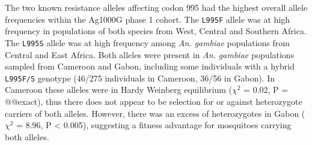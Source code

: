 \documentclass[a4paper,11pt,abstracton,hidelinks]{scrartcl}
\begin{document}
The two known resistance alleles affecting codon 995 had the highest overall allele frequencies within the Ag1000G phase 1 cohort.
%
The \texttt{L995F} allele was at high frequency in populations of both species from West, Central and Southern Africa.
%
The \texttt{L995S} allele was at high frequency among \textit{An. gambiae} populations from Central and East Africa.
%
Both alleles were present in \textit{An. gambiae} populations sampled from Cameroon and Gabon, including some individuals with a hybrid \texttt{L995F/S} genotype (46/275 individuals in Cameroon, 36/56 in Gabon).
%
In Cameroon these alleles were in Hardy Weinberg equilibrium ($\chi^{2}$ = 0.02, P = @@exact), thus there does not appear to be selection for or against heterozygote carriers of both alleles.
%
However, there was an excess of heterozygotes in Gabon ($\chi^{2}$ = 8.96, P < 0.005), suggesting a fitness advantage for mosquitoes carrying both alleles.


\end{document}
